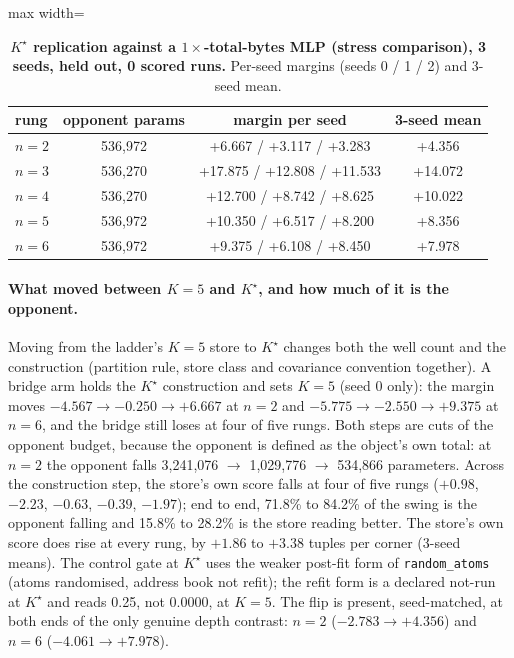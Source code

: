 \documentclass{article} %
\newcommand{\Kstar}{\ensuremath{K^{\star}}}
\begin{document}
\begin{table}[h]
\centering\small
\caption{\textbf{$\Kstar$ replication against a $1\times$-total-bytes MLP (stress comparison),
3 seeds, held out, 0 scored runs.} Per-seed margins (seeds 0 / 1 / 2) and 3-seed mean.}
\label{tab:1x}
\begin{adjustbox}{max width=\linewidth}\begin{tabular}{lccc}
\toprule
rung & opponent params & margin per seed & 3-seed mean \\
\midrule
$n=2$ & 536,972 & +6.667 / +3.117 / +3.283 & +4.356 \\
$n=3$ & 536,270 & +17.875 / +12.808 / +11.533 & +14.072 \\
$n=4$ & 536,270 & +12.700 / +8.742 / +8.625 & +10.022 \\
$n=5$ & 536,972 & +10.350 / +6.517 / +8.200 & +8.356 \\
$n=6$ & 536,972 & +9.375 / +6.108 / +8.450 & +7.978 \\
\bottomrule
\end{tabular}\end{adjustbox}
\end{table}

\paragraph{What moved between $K=5$ and $\Kstar$, and how much of it is the opponent.} Moving
from the ladder's $K=5$ store to $\Kstar$ changes both the well count and the construction
(partition rule, store class and covariance convention together). A bridge arm holds the
$\Kstar$ construction and sets $K=5$ (seed 0 only): the margin moves $-4.567\to-0.250\to+6.667$
at $n=2$ and $-5.775\to-2.550\to+9.375$ at $n=6$, and the bridge still loses at four of five
rungs. %
Both steps are cuts of the opponent budget, because the opponent is defined as the object's own
total: at $n=2$ the opponent falls 3,241,076 $\to$ 1,029,776 $\to$ 534,866 parameters. Across the
construction step, the store's own score falls at four of five rungs ($+0.98$, $-2.23$, $-0.63$,
$-0.39$, $-1.97$); end to end, 71.8\% to 84.2\% of the swing is the opponent falling and 15.8\%
to 28.2\% is the store reading better. %
The store's own score does rise at every rung, by $+1.86$ to $+3.38$ tuples per corner (3-seed
means). %
The control gate at $\Kstar$ uses the weaker post-fit form of \texttt{random\_atoms} (atoms
randomised, address book not refit); the refit form is a declared not-run at $\Kstar$ and reads
0.25, not 0.0000, at $K=5$. %
The flip is present, seed-matched, at both ends of the only genuine depth contrast: $n=2$
($-2.783\to+4.356$) and $n=6$ ($-4.061\to+7.978$). %
\end{document}
